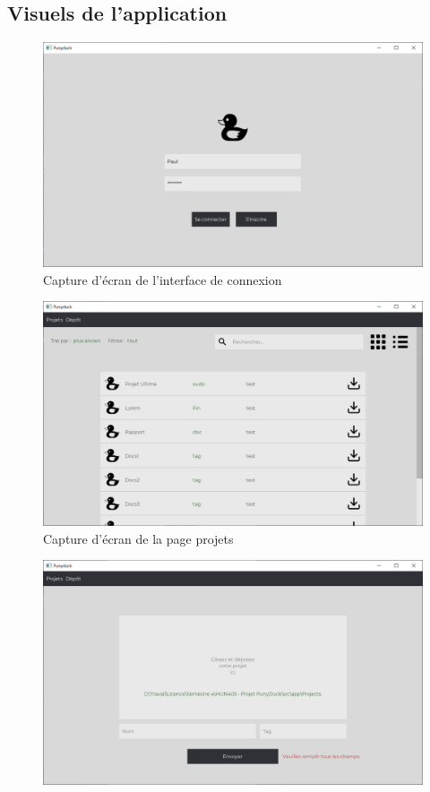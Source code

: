 \documentclass[twoside]{report}
\begin{document}
\begin{appendix}
\chapter{Visuels de l'application}
\label{visuels}
\begin{figure}[!h]
    \centering 
    \includegraphics[scale=0.3]{punyduck-img-1.png}
    \caption{Capture d'écran de l'interface de connexion}
    \label{Connexion}
\end{figure}
\begin{figure}
    \centering
    \includegraphics[scale=0.3]{punyduck-img-2.png}
    \caption{Capture d'écran de la page projets}
    \label{Projets}
\end{figure}
\begin{figure}
    \centering
    \includegraphics[scale=0.3]{punyduck-img-4.png}

\end{figure}
\end{appendix}
\end{document}
